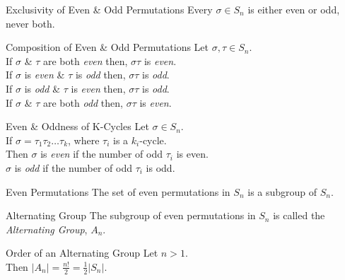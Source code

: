 \documentclass[11pt,a4paper]{article}
\begin{document}
\subtitle{Theorem 14.05 - }{Exclusivity of Even \& Odd Permutations}
Every $\sigma \in S_n$ is either even or odd, never both.\\

\subtitle{Proposition 14.06 - }{Composition of Even \& Odd Permutations}
Let $\sigma, \tau \in S_n$.\\
If $\sigma$ \& $\tau$ are both \textit{even} then, $\sigma\tau$ is \textit{even}.\\
If $\sigma$ is \textit{even} \& $\tau$ is \textit{odd} then, $\sigma\tau$ is \textit{odd}.\\
If $\sigma$ is \textit{odd} \& $\tau$ is \textit{even} then, $\sigma\tau$ is \textit{odd}.\\
If $\sigma$ \& $\tau$ are both \textit{odd} then, $\sigma\tau$ is \textit{even}.\\

\subtitle{Proposition 14.07 - }{Even \& Oddness of K-Cycles}
Let $\sigma \in S_n$.\\
If $\sigma = \tau_1\tau_2 \dots \tau_k$, where $\tau_i$ is a $k_i$-cycle.\\
Then $\sigma$ is \textit{even} if the number of odd $\tau_i$ is even.\\
$\sigma$ is \textit{odd} if the number of odd $\tau_i$ is odd.\\

\subtitle{Proposition 14.08 - }{Even Permutations}
The set of even permutations in $S_n$ is a subgroup of $S_n$.\\

\subtitle{Definition 14.09 - }{Alternating Group}
The subgroup of even permutations in $S_n$ is called the \textit{Alternating Group}, $A_n$.\\

\subtitle{Theorem 14.10 - }{Order of an Alternating Group}
Let $n > 1$.\\
Then $|A_n| = \frac{n!}{2} = \frac{1}{2}|S_n|$.\\
\end{document}
